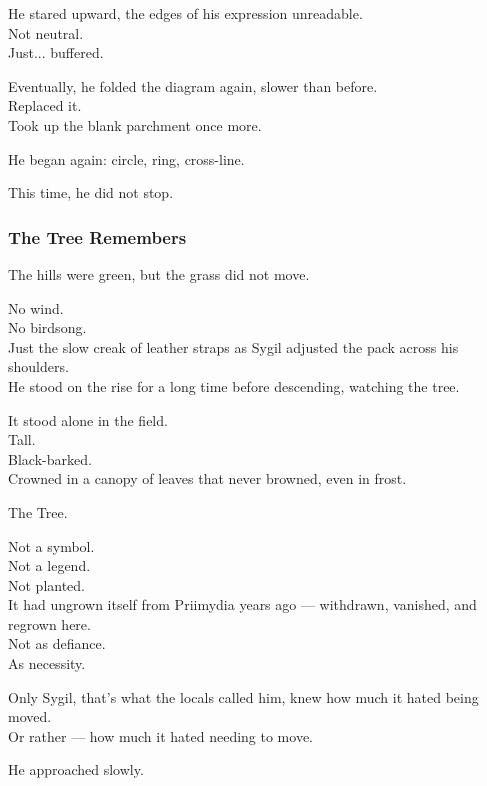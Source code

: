 \documentclass[12pt]{article}
\begin{document}
He stared upward, the edges of his expression unreadable.\\
Not neutral.\\
Just... buffered.

\vspace{1em}

Eventually, he folded the diagram again, slower than before.\\
Replaced it.\\
Took up the blank parchment once more.

He began again: circle, ring, cross-line.

\vspace{1em}

This time, he did not stop.

\dotfill

\subsubsection*{The Tree Remembers}

The hills were green, but the grass did not move.

No wind.\\
No birdsong.\\
Just the slow creak of leather straps as Sygil adjusted the pack across his shoulders.\\
He stood on the rise for a long time before descending, watching the tree.

It stood alone in the field.\\
Tall.\\
Black-barked.\\
Crowned in a canopy of leaves that never browned, even in frost.

The Tree.

Not a symbol.\\
Not a legend.\\
Not planted.\\
It had ungrown itself from Priimydia years ago — withdrawn, vanished, and regrown here.\\
Not as defiance.\\
As necessity.

Only Sygil, that’s what the locals called him, knew how much it hated being moved.\\
Or rather — how much it hated needing to move.

\vspace{1em}

He approached slowly.
\end{document}
